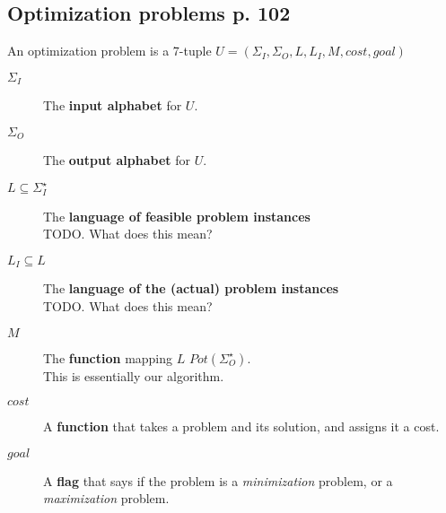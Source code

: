 \documentclass[a4paper,10pt]{article}
\begin{document}
\subsection{Optimization problems p. 102}
An optimization problem is a 7-tuple $U = (\Sigma _I, \Sigma _O, L, L_I, M, cost, goal)$
\begin{description}
\item[$\Sigma _I$] 											The \textbf{input alphabet} for $U$.
\item[$\Sigma _ O$] 										The \textbf{output alphabet} for $U$.
\item[$L \subseteq \Sigma_{I}^{\star}$]	The \textbf{language of feasible problem instances} \hfill \\
																				TODO. What does this mean?
\item[$L_I \subseteq L$]								The \textbf{language of the (actual) problem instances} \hfill \\
																				TODO. What does this mean?
\item[$M$] 															The \textbf{function} mapping $L$ \rightarrow $Pot(\Sigma_{O}^\star)$. \hfill \\
																				This is essentially our algorithm.
\item[$cost$]														A \textbf{function} that takes a problem and its solution, and assigns it a cost.
\item[$goal$]														A \textbf{flag} that says if the problem is a \emph{minimization} problem, or a \emph{maximization} problem.
\end{description}
\end{document}
